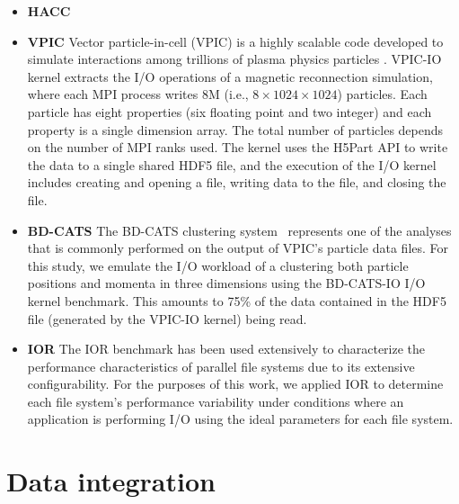 \begin{itemize}
\item \textbf{HACC} 
\item \textbf{VPIC}  
Vector particle-in-cell (VPIC) is a highly scalable code developed to simulate
interactions among trillions of plasma physics particles  \cite{Bowers2008}.
VPIC-IO kernel extracts the I/O operations of a magnetic reconnection
simulation, where each MPI process writes 8M (i.e., $8 \times 1024 \times 1024$) particles. Each
particle has eight properties (six floating point and two integer) and each
property is a single dimension array. The total number of particles depends on
the number of MPI ranks used. The kernel uses the H5Part API \cite{H5Part} to write
the data to a single shared HDF5 file, and the execution of the I/O kernel includes
creating and opening a file, writing data to the file, and closing the file.

\item \textbf{BD-CATS}  The BD-CATS clustering system~\cite{Patwary2015}  represents
one of the analyses that is commonly performed on the output of VPIC's particle data files.
For this study, we emulate the I/O workload of a clustering both particle
positions and momenta in three dimensions using the BD-CATS-IO I/O kernel benchmark.  This amounts to 75\% of the data
contained in the HDF5 file (generated by the VPIC-IO kernel) being read.

\item \textbf{IOR}  The IOR benchmark has been used extensively
to characterize the performance characteristics of parallel file systems\cite{Yildiz2016,Xie2012,Lofstead2010,Uselton2010}
due to its extensive configurability.  For the purposes of this work, we applied
IOR to determine each file system's performance variability under conditions
where an application is performing I/O using the ideal parameters for each
file system.

\end{itemize}

\section{Data integration}


